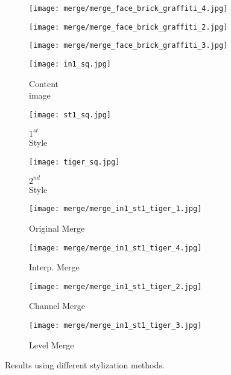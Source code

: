 \begin{figure}[H]
\begin{subfigure}[b]{0.13\linewidth}
	\end{subfigure}
	\begin{subfigure}[b]{0.13\linewidth}
		\texttt{[image: merge/merge\_face\_brick\_graffiti\_4.jpg]} %
	\end{subfigure}
	\begin{subfigure}[b]{0.13\linewidth}
		\texttt{[image: merge/merge\_face\_brick\_graffiti\_2.jpg]} %
	\end{subfigure}
	\begin{subfigure}[b]{0.13\linewidth}
		\texttt{[image: merge/merge\_face\_brick\_graffiti\_3.jpg]} %
	\end{subfigure}
	\centering
	\begin{subfigure}[b]{0.13\linewidth}
		\texttt{[image: in1\_sq.jpg]} %
		\caption{Content \\ image}
	\end{subfigure}
	\begin{subfigure}[b]{0.13\linewidth}
		\texttt{[image: st1\_sq.jpg]} %
		\caption{$1^{st}$ \\ Style}
	\end{subfigure}
	\begin{subfigure}[b]{0.13\linewidth}
		\texttt{[image: tiger\_sq.jpg]} %
		\caption{$2^{nd}$ \\ Style}
	\end{subfigure}
	\begin{subfigure}[b]{0.13\linewidth}
		\texttt{[image: merge/merge\_in1\_st1\_tiger\_1.jpg]} %
		\caption{Original Merge}
	\end{subfigure}
	\begin{subfigure}[b]{0.13\linewidth}
		\texttt{[image: merge/merge\_in1\_st1\_tiger\_4.jpg]} %
		\caption{Interp. Merge}
	\end{subfigure}
	\begin{subfigure}[b]{0.13\linewidth}
		\texttt{[image: merge/merge\_in1\_st1\_tiger\_2.jpg]} %
		\caption{Channel Merge}
	\end{subfigure}
	\begin{subfigure}[b]{0.13\linewidth}
		\texttt{[image: merge/merge\_in1\_st1\_tiger\_3.jpg]} %
		\caption{Level Merge}
	\end{subfigure}
		\caption{Results using different stylization methods.}
		\label{fig:Merge}
\end{figure}
